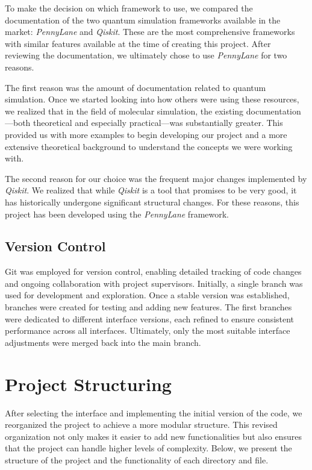 To make the decision on which framework to use, we compared the documentation of the two quantum simulation frameworks available in the market: \textit{PennyLane} and \textit{Qiskit}. These are the most comprehensive frameworks with similar features available at the time of creating this project. After reviewing the documentation, we ultimately chose to use \textit{PennyLane} for two reasons.

The first reason was the amount of documentation related to quantum simulation. Once we started looking into how others were using these resources, we realized that in the field of molecular simulation, the existing documentation—both theoretical and especially practical—was substantially greater. This provided us with more examples to begin developing our project and a more extensive theoretical background to understand the concepts we were working with.

The second reason for our choice was the frequent major changes implemented by \textit{Qiskit}. We realized that while \textit{Qiskit} is a tool that promises to be very good, it has historically undergone significant structural changes. For these reasons, this project has been developed using the \textit{PennyLane} framework.

\subsection{Version Control}
Git was employed for version control, enabling detailed tracking of code changes and ongoing collaboration with project supervisors. Initially, a single branch was used for development and exploration. Once a stable version was established, branches were created for testing and adding new features. The first branches were dedicated to different interface versions, each refined to ensure consistent performance across all interfaces. Ultimately, only the most suitable interface adjustments were merged back into the main branch.

\section{Project Structuring}

After selecting the interface and implementing the initial version of the code, we reorganized the project to achieve a more modular structure. This revised organization not only makes it easier to add new functionalities but also ensures that the project can handle higher levels of complexity. Below, we present the structure of the project and the functionality of each directory and file.

